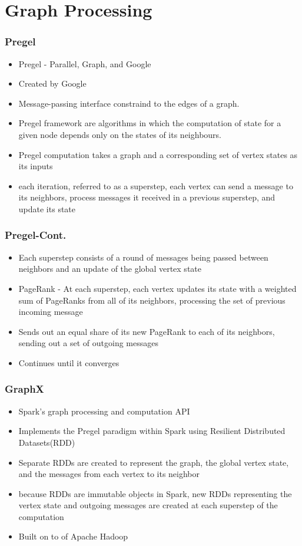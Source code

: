\documentclass{beamer}
\begin{document}
\section{Graph Processing}
\begin{frame}
  \frametitle{Pregel}
	\begin{itemize}
	\item{Pregel - Parallel, Graph, and Google}
	\item{Created by Google}
	\item{Message-passing interface constraind to the edges of a graph.}
	\item{Pregel framework are algorithms in which the
computation of state for a given node depends only on the states of its neighbours.}
	\item{Pregel computation takes a graph and a corresponding
set of vertex states as its inputs}
	\item{each iteration, referred to as a superstep, each vertex can send
a message to its neighbors,  process messages it received in a previous superstep,  and update its
state}
	\end{itemize}
\end{frame}
\begin{frame}
  \frametitle{Pregel-Cont.}
	\begin{itemize}
	\item{Each superstep consists of a round of messages being passed between neighbors and an
update of the global vertex state}
	\item{PageRank - At each superstep, each vertex
updates its state with a weighted sum of PageRanks from all of its neighbors, processing the set of
previous incoming message}
	\item{Sends out an equal share of its new PageRank to each of its
neighbors, sending out a set of outgoing messages}
	\item{Continues until it converges}
	\end{itemize}
\end{frame}
\begin{frame}
  \frametitle{GraphX}
	\begin{itemize}
	\item{Spark's graph processing and computation API}
	\item{Implements the Pregel paradigm within Spark using Resilient Distributed Datasets(RDD)}
	\item{Separate RDDs are created to represent the graph,
the global vertex state, and the messages from each vertex to its neighbor}
	\item{ because RDDs
are immutable objects in Spark, new RDDs representing the vertex state and outgoing messages
are created at each superstep of the computation}
	\item{Built on to of Apache Hadoop}
	\end{itemize}
\end{frame}
\end{document}
